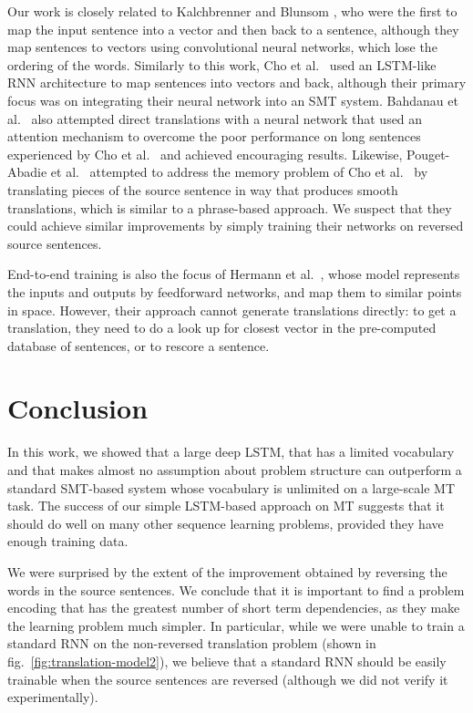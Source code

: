 \documentclass{article} \usepackage{nips14submit_e}
\begin{document}
Our work is closely related to Kalchbrenner and Blunsom \cite{kal13},
who were the first to map the input sentence into a vector and then
back to a sentence, although they map sentences to vectors using
convolutional neural networks, which lose the ordering of the words.
Similarly to this work, Cho et al.~\cite{cho14} used an LSTM-like RNN
architecture to map sentences into vectors and back, although their
primary focus was on integrating their neural network into an SMT
system.  Bahdanau et al.~\cite{bog14} also attempted direct
translations with a neural network that used an attention mechanism to
overcome the poor performance on long sentences experienced by Cho et
al.~\cite{cho14} and achieved encouraging results.  Likewise,
Pouget-Abadie et al.~\cite{curse} attempted to address the memory
problem of Cho et al.~\cite{cho14} by translating pieces of the source
sentence in way that produces smooth translations, which is similar to
a phrase-based approach.  We suspect that they could achieve similar
improvements by simply training their networks on reversed source
sentences.


End-to-end training is also the focus of Hermann et
al.~\cite{hermann14}, whose model represents the inputs and outputs by
feedforward networks, and map them to similar points in
space. However, their approach cannot generate translations directly:
to get a translation, they need to do a look up for closest vector in
the pre-computed database of sentences, or to rescore a sentence.
 
\section{Conclusion}

In this work, we showed that a large deep LSTM, that has a limited 
vocabulary and that makes almost no
assumption about problem structure can outperform a standard SMT-based system whose vocabulary
is unlimited on a large-scale MT task.  The success of our simple
LSTM-based approach on MT suggests that it should do well on many
other sequence learning problems, provided they have enough training
data.

We were surprised by the extent of the improvement obtained by
reversing the words in the source sentences.  We conclude that it is
important to find a problem encoding that has the greatest number of
short term dependencies, as they make the learning problem much
simpler.  In particular, while we were unable to train a standard
RNN on the non-reversed translation problem (shown in
fig.~\ref{fig:translation-model2}), we believe that a standard RNN
should be easily trainable when the source sentences are reversed (although we
did not verify it experimentally).
\end{document}
